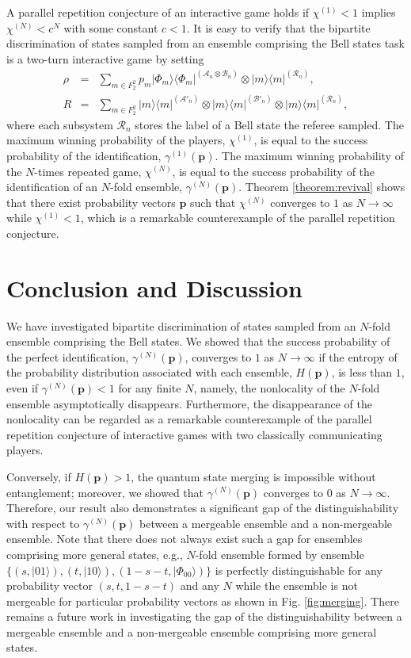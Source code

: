 \documentclass[aps,prx,twocolumn,showpacs,amsmath,notitlepage,amssymb,superscriptaddress]{revtex4-1}
\newcommand{\bra}[1]{\langle {#1} |}
\newcommand{\ket}[1]{| {#1} \rangle}
\begin{document}
A parallel repetition conjecture of an interactive game holds if $\chi^{(1)}<1$ implies $\chi^{(N)}<c^N$ with some constant $c<1$. It is easy to verify that the bipartite discrimination of states sampled from an ensemble comprising the Bell states task is a two-turn interactive game by setting
\begin{eqnarray}
 \rho&=&\sum_{m\in F_2^2}p_m\ket{\Phi_m}\bra{\Phi_m}^{(\mathcal{A}_n\otimes\mathcal{B}_n)}\otimes\ket{m}\bra{m}^{(\mathcal{R}_n)},\\
 R&=&\sum_{m\in F_2^2} \ket{m}\bra{m}^{(\mathcal{A}'_n)}\otimes \ket{m}\bra{m}^{(\mathcal{B}'_n)}\otimes \ket{m}\bra{m}^{(\mathcal{R}_n)},
\end{eqnarray}
where each subsystem $\mathcal{R}_n$ stores the label of a Bell state the referee sampled. The maximum winning probability of the players, $\chi^{(1)}$, is equal to the success probability of the identification, $\gamma^{(1)}(\mathbf{p})$. The maximum winning probability of the $N$-times repeated game, $\chi^{(N)}$, is equal to the success probability of the identification of an $N$-fold ensemble, $\gamma^{(N)}(\mathbf{p})$. Theorem \ref{theorem:revival} shows that there exist probability vectors $\mathbf{p}$ such that $\chi^{(N)}$ converges to $1$ as $N\rightarrow \infty$ while $\chi^{(1)}<1$, which is a remarkable counterexample of the parallel repetition conjecture.

\section{Conclusion and Discussion}
We have investigated bipartite discrimination of states sampled from an $N$-fold ensemble comprising the Bell states. We showed that the success probability of the perfect identification, $\gamma^{(N)}(\mathbf{p})$, converges to $1$ as $N\rightarrow\infty$ if the entropy of the probability distribution associated with each ensemble, $H(\mathbf{p})$, is less than $1$, even if $\gamma^{(N)}(\mathbf{p})<1$ for any finite $N$, namely, the nonlocality of the $N$-fold ensemble asymptotically disappears. Furthermore, the disappearance of the nonlocality can be regarded as a remarkable counterexample of the parallel repetition conjecture of interactive games with two classically communicating players.

Conversely, if $H(\mathbf{p})>1$, the quantum state merging is impossible without entanglement; moreover, we showed that $\gamma^{(N)}(\mathbf{p})$ converges to $0$ as $N\rightarrow\infty$. Therefore, our result also demonstrates a significant gap of the distinguishability with respect to $\gamma^{(N)}(\mathbf{p})$ between a mergeable ensemble and a non-mergeable ensemble.
Note that there does not always exist such a gap for ensembles comprising more general states, e.g., $N$-fold ensemble formed by ensemble $\{(s,\ket{01}),(t,\ket{10}),(1-s-t,\ket{\Phi_{00}})\}$ is perfectly distinguishable for any probability vector $(s,t,1-s-t)$ and any $N$ while the ensemble is not mergeable for particular probability vectors as shown in Fig. \ref{fig:merging}.
There remains a future work in investigating the gap of the distinguishability between a mergeable ensemble and a non-mergeable ensemble comprising more general states.
\end{document}
